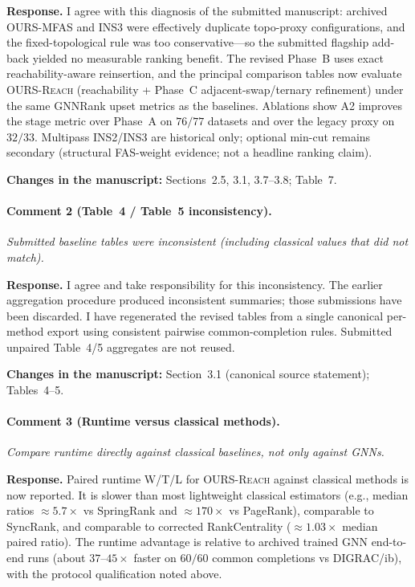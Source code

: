 \documentclass[11pt]{article}
\newcommand{\commentbox}[1]{\par\textit{#1}\par\medskip}
\newcommand{\changes}[1]{\textbf{Changes in the manuscript:} #1\par\medskip}
\begin{document}
\noindent\textbf{Response.}
I agree with this diagnosis of the submitted manuscript: archived \textsc{OURS-MFAS} and \textsc{INS3} were effectively duplicate topo-proxy configurations, and the fixed-topological rule was too conservative---so the submitted flagship add-back yielded no measurable ranking benefit. The revised Phase~B uses exact reachability-aware reinsertion, and the principal comparison tables now evaluate \textsc{OURS-Reach} (reachability + Phase~C adjacent-swap/ternary refinement) under the same GNNRank upset metrics as the baselines. Ablations show A2 improves the stage metric over Phase~A on $76/77$ datasets and over the legacy proxy on $32/33$. Multipass INS2/INS3 are historical only; optional min-cut remains secondary (structural FAS-weight evidence; not a headline ranking claim).

\changes{Sections~2.5, 3.1, 3.7--3.8; Table~7.}

\paragraph{Comment 2 (Table~4 / Table~5 inconsistency).}
\commentbox{Submitted baseline tables were inconsistent (including classical values that did not match).}

\noindent\textbf{Response.}
I agree and take responsibility for this inconsistency. The earlier aggregation procedure produced inconsistent summaries; those submissions have been discarded. I have regenerated the revised tables from a single canonical per-method export using consistent pairwise common-completion rules. Submitted unpaired Table~4/5 aggregates are not reused.

\changes{Section~3.1 (canonical source statement); Tables~4--5.}

\paragraph{Comment 3 (Runtime versus classical methods).}
\commentbox{Compare runtime directly against classical baselines, not only against GNNs.}

\noindent\textbf{Response.}
Paired runtime W/T/L for \textsc{OURS-Reach} against classical methods is now reported. It is slower than most lightweight classical estimators (e.g., median ratios $\approx 5.7\times$ vs SpringRank and $\approx 170\times$ vs PageRank), comparable to SyncRank, and comparable to corrected RankCentrality ($\approx 1.03\times$ median paired ratio). The runtime advantage is relative to archived trained GNN end-to-end runs (about $37$--$45\times$ faster on $60/60$ common completions vs DIGRAC/ib), with the protocol qualification noted above.
\end{document}
